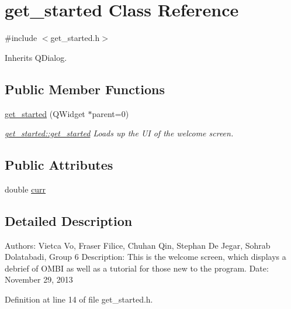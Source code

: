 \hypertarget{classget__started}{\section{get\-\_\-started Class Reference}
\label{classget__started}
}


{\ttfamily \#include $<$get\-\_\-started.\-h$>$}



Inherits Q\-Dialog.

\subsection*{Public Member Functions}
\begin{DoxyCompactItemize}
\item 
\hyperlink{classget__started_aa9ade2e7cd69d8cb9df33e7c445f00bb}{get\-\_\-started} (Q\-Widget $\ast$parent=0)
\begin{DoxyCompactList}\small\item\em \hyperlink{classget__started_aa9ade2e7cd69d8cb9df33e7c445f00bb}{get\-\_\-started\-::get\-\_\-started} Loads up the U\-I of the welcome screen. \end{DoxyCompactList}\end{DoxyCompactItemize}
\subsection*{Public Attributes}
\begin{DoxyCompactItemize}
\item 
double \hyperlink{classget__started_ab65d539446e3ba9a58981d511080f926}{curr}
\end{DoxyCompactItemize}


\subsection{Detailed Description}
Authors\-: Vietca Vo, Fraser Filice, Chuhan Qin, Stephan De Jegar, Sohrab Dolatabadi, Group 6 Description\-: This is the welcome screen, which displays a debrief of O\-M\-B\-I as well as a tutorial for those new to the program. Date\-: November 29, 2013 

Definition at line 14 of file get\-\_\-started.\-h.



